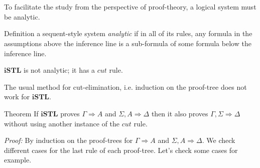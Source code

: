 \documentclass{beamer}
\begin{document}
\section{\secProposal}

\begin{frame}{\subAnalytic}
	To facilitate the study from the perspective of proof-theory, a logical system must be analytic.

	\begin{block}{Definition}
		a sequent-style system \emph{analytic} if in all of its rules, any formula in the assumptions above the inference line is a sub-formula of some formula below the inference line.
		\vspace{1ex}
	\end{block}

	$\mathbf{iSTL}$ is not analytic; it has a $cut$ rule.
	\begin{block}{}
		\begin{prooftree}
			\BIC{$\Gamma, \Sigma \Rightarrow \Delta$}
		\end{prooftree}
	\end{block}
\end{frame}

\begin{frame}{\subAnalytic}
	The usual method for cut-elimination, i.e. induction on the proof-tree does not work for $\mathbf{iSTL}$.
	\begin{exampleblock}{Theorem}
		If $\mathbf{iSTL}$ proves $\Gamma \Rightarrow A$ and $\Sigma, A \Rightarrow \Delta$ then it also proves $\Gamma, \Sigma \Rightarrow \Delta$ without using another instance of the $cut$ rule.
			
		\quad \emph{Proof:} By induction on the proof-trees for $\Gamma \Rightarrow A$ and $\Sigma, A \Rightarrow \Delta$. We check different cases for the last rule of each proof-tree. Let's check some cases for example.
		
		\quad [ \dots ]

	\end{exampleblock}
\end{frame}
\end{document}
